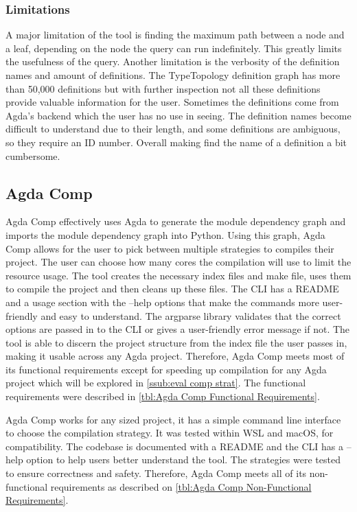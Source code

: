 \subsubsection{Limitations}

A major limitation of the tool is finding the maximum path between a node and a
leaf, depending on the node the query can run indefinitely. This greatly limits
the usefulness of the query. Another limitation is the verbosity of the
definition names and amount of definitions. The TypeTopology definition graph
has more than 50,000 definitions but with further inspection not all these
definitions provide valuable information for the user. Sometimes the
definitions come from Agda's backend which the user has no use in seeing. The
definition names become difficult to understand due to their length, and some
definitions are ambiguous, so they require an ID number. Overall making find
the name of a definition a bit cumbersome.


\subsection{Agda Comp} \label{sub:eval agda comp}

Agda Comp effectively uses Agda to generate the module dependency graph and
imports the module dependency graph into Python. Using this graph, Agda Comp
allows for the user to pick between multiple strategies to compiles their
project. The user can choose how many cores the compilation will use to limit
the resource usage. The tool creates the necessary index files and make file,
uses them to compile the project and then cleans up these files. The CLI has a
README and a usage section with the \textsf{--help} options that make the
commands more user-friendly and easy to understand. The argparse library
validates that the correct options are passed in to the CLI or gives a
user-friendly error message if not. The tool is able to discern the project
structure from the index file the user passes in, making it usable across any
Agda project. Therefore, Agda Comp meets most of its functional requirements
except for speeding up compilation for any Agda project which will be explored
in \cref{ssub:eval comp strat}.  The functional requirements were
described in \cref{tbl:Agda Comp Functional Requirements}.

Agda Comp works for any sized project, it has a simple command line interface
to choose the compilation strategy. It was tested within WSL and macOS, for
compatibility. The codebase is documented with a README and the CLI has a
\textsf{--help} option to help users better understand the tool. The strategies
were tested to ensure correctness and safety. Therefore, Agda Comp meets all of
its non-functional requirements as described on \cref{tbl:Agda Comp
Non-Functional Requirements}.

